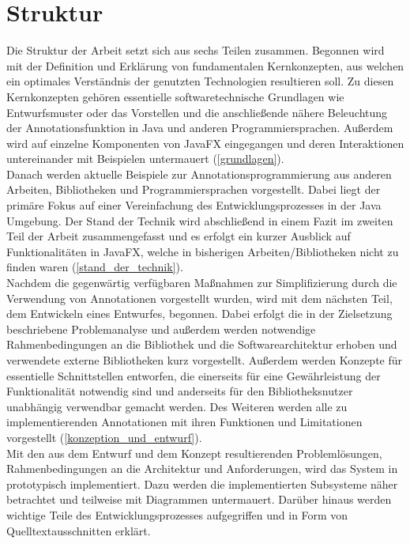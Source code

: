 \section{Struktur}
\label{struktur}
Die Struktur der Arbeit setzt sich aus sechs Teilen zusammen. Begonnen wird mit der Definition und Erklärung von fundamentalen Kernkonzepten, aus welchen ein optimales Verständnis der genutzten Technologien resultieren soll. Zu diesen Kernkonzepten gehören essentielle softwaretechnische Grundlagen wie Entwurfsmuster oder das Vorstellen und die anschließende nähere Beleuchtung der Annotationsfunktion in Java und anderen Programmiersprachen. Außerdem wird auf einzelne Komponenten von JavaFX eingegangen und deren Interaktionen untereinander mit Beispielen untermauert (\autoref{grundlagen}).\\
Danach werden aktuelle Beispiele zur Annotationsprogrammierung aus anderen Arbeiten, Bibliotheken und Programmiersprachen vorgestellt. Dabei liegt der primäre Fokus auf einer Vereinfachung des Entwicklungsprozesses in der Java Umgebung. Der Stand der Technik wird abschließend in einem Fazit im zweiten Teil der Arbeit zusammengefasst und es erfolgt ein kurzer Ausblick auf Funktionalitäten in JavaFX, welche in bisherigen Arbeiten/Bibliotheken nicht zu finden waren (\autoref{stand_der_technik}).\\
Nachdem die gegenwärtig verfügbaren Maßnahmen zur Simplifizierung durch die Verwendung von Annotationen vorgestellt wurden, wird mit dem nächsten Teil, dem Entwickeln eines Entwurfes, begonnen. Dabei erfolgt die in der Zielsetzung beschriebene Problemanalyse und außerdem werden notwendige Rahmenbedingungen an die Bibliothek und die Softwarearchitektur erhoben und verwendete externe Bibliotheken kurz vorgestellt. Außerdem werden Konzepte für essentielle Schnittstellen entworfen, die einerseits für eine Gewährleistung der Funktionalität notwendig sind und anderseits für den Bibliotheksnutzer unabhängig verwendbar gemacht werden. Des Weiteren werden alle zu implementierenden Annotationen mit ihren Funktionen und Limitationen vorgestellt (\autoref{konzeption_und_entwurf}).\\
Mit den aus dem Entwurf und dem Konzept resultierenden Problemlösungen, Rahmenbedingungen an die Architektur und Anforderungen, wird das System in  prototypisch implementiert. Dazu werden die implementierten Subsysteme näher betrachtet und teilweise mit Diagrammen untermauert. Darüber hinaus werden wichtige Teile des Entwicklungsprozesses aufgegriffen und in Form von Quelltextausschnitten erklärt.\\
